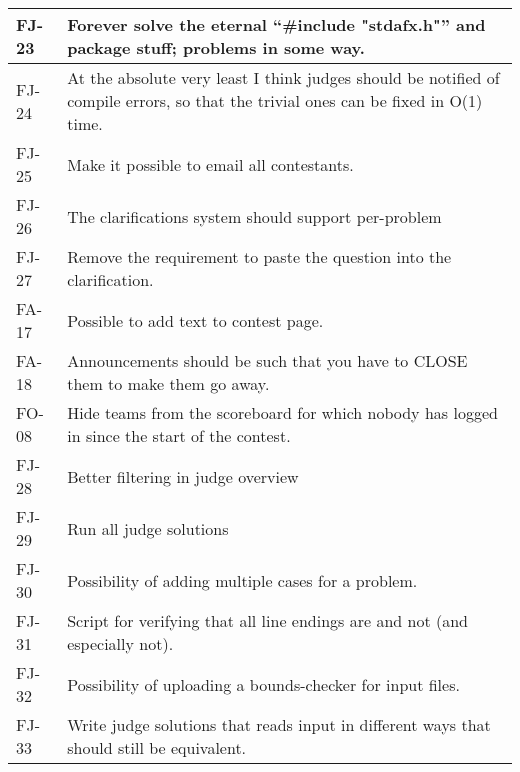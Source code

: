 \begin{longtable}{|l|p{12.5cm}|}
FJ-23 & Forever solve the eternal ``\#include "stdafx.h"'' and package stuff; problems in some way. \\
\hline

FJ-24 & At the absolute very least I think judges should be notified of compile errors, so that the trivial ones can be fixed in O(1) time. \\
\hline

FJ-25 & Make it possible to email all contestants. \\
\hline

FJ-26 & The clarifications system should support per-problem  \\
\hline

FJ-27 & Remove the requirement to paste the question into the clarification.  \\
\hline

FA-17 & Possible to add text to contest page.  \\
\hline

FA-18 & Announcements should be such that you have to CLOSE them to make them go away. \\
\hline

FO-08 & Hide teams from the scoreboard for which nobody has logged in since the start of the contest. \\
\hline

FJ-28 & Better filtering in judge overview \\
\hline

FJ-29 & Run all judge solutions \\
\hline

FJ-30 & Possibility of adding multiple cases for a problem. \\
\hline

FJ-31 & Script for verifying that all line endings are and not (and especially not). \\
\hline

FJ-32 & Possibility of uploading a bounds-checker for input files. \\
\hline

FJ-33 & Write judge solutions that reads input in different ways that should still be equivalent. \\
\hline

\end{longtable} 
